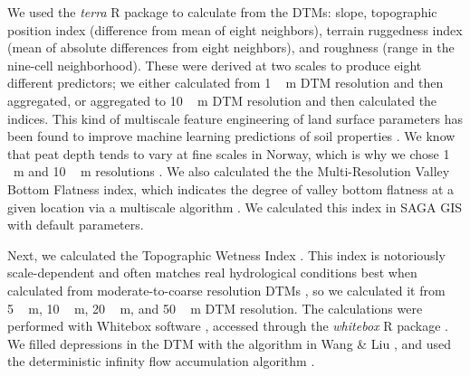 \documentclass[soil, manuscript]{copernicus}
\begin{document}
We used the \emph{terra} R package to calculate from the DTMs: slope, topographic position index (difference from mean of eight neighbors), terrain ruggedness index (mean of absolute differences from eight neighbors), and roughness (range in the nine-cell neighborhood).
These were derived at two scales to produce eight different predictors; we either calculated from \unit{1\,m} DTM resolution and then aggregated, or aggregated to \unit{10\,m} DTM resolution and then calculated the indices.
This kind of multiscale feature engineering of land surface parameters has been found to improve machine learning predictions of soil properties \citep{millerImpactMultiscalePredictor2015, dornikOptimalScalingPredictors2022, newmanAssessingSpatiallyHeterogeneous2023}.
We know that peat depth tends to vary at fine scales in Norway, which is why we chose \unit{1\,m} and \unit{10\,m} resolutions \citep{maxwellLandsurfaceParametersSpatial2022}.
We also calculated the the Multi-Resolution Valley Bottom Flatness index, which indicates the degree of valley bottom flatness at a given location via a multiscale algorithm \citep{gallantMultiresolutionIndexValley2003}.
We calculated this index in SAGA GIS \citep[v.9.3.2,][]{conradSystemAutomatedGeoscientific2015} with default parameters.

Next, we calculated the Topographic Wetness Index \citep{quinnPredictionHillslopeFlow1991}.
This index is notoriously scale-dependent and often matches real hydrological conditions best when calculated from moderate-to-coarse resolution DTMs \citep{agrenEvaluatingDigitalTerrain2014, riihimakiTopographicWetnessIndex2021}, so we calculated it from \unit{5\,m}, \unit{10\,m}, \unit{20\,m}, and \unit{50\,m} DTM resolution.
The calculations were performed with Whitebox software \citep{lindsayWhiteboxGATCase2016}, accessed through the \emph{whitebox} R package \citep[v2.4,][]{wuWhiteboxWhiteboxToolsFrontend2022}.
We filled depressions in the DTM with the algorithm in Wang \& Liu \citeyearpar{wangEfficientMethodIdentifying2006}, and used the deterministic infinity flow accumulation algorithm \citep{tarbotonNewMethodDetermination1997}.
\end{document}

